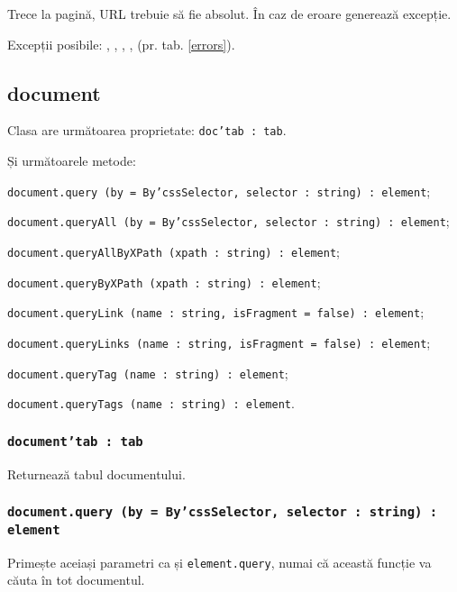 Trece la pagină, URL trebuie să fie absolut. În caz de eroare generează excepție.

Excepții posibile: , , , ,  (pr. tab. \ref{errors}).

\subsection{document}

Clasa \dom{} are următoarea proprietate: \texttt{doc'tab : tab}.

Și următoarele metode:
\begin{icItems}
	\item \texttt{document.query (by = By'cssSelector, selector : string) : element};
	\item \texttt{document.queryAll (by = By'cssSelector, selector : string) : element};
	\item \texttt{document.queryAllByXPath (xpath : string) : element};
	\item \texttt{document.queryByXPath (xpath : string) : element};
	\item \texttt{document.queryLink (name : string, isFragment = false) : element};
	\item \texttt{document.queryLinks (name : string, isFragment = false) : element};
	\item \texttt{document.queryTag (name : string) : element};
	\item \texttt{document.queryTags (name : string) : element}.
\end{icItems}

\subsubsection{\texttt{document'tab : tab}}

Returnează tabul documentului.

\subsubsection{\texttt{document.query (by = By'cssSelector, selector : string) : element}}

Primește aceiași parametri ca și  \texttt{element.query}, numai că această funcție va căuta în tot documentul.

